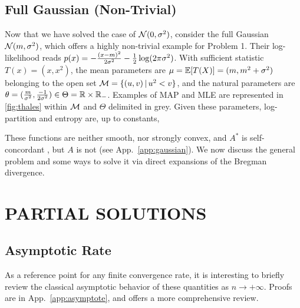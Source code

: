 \documentclass[twoside]{article}
\newcommand{\cond}{\,\vert\,}
\newcommand{\logpart}{A}
\newcommand{\conj}{{\logpart^*}}
\newcommand{\nat}{\theta}
\newcommand{\m}{\mu}
\begin{document}
\subsection{Full Gaussian (Non-Trivial)}
\label{ssec:gaussian}
Now that we have solved the case of ${\mathcal N}(0,\sigma^2)$, consider the full Gaussian ${\mathcal N}(m,\sigma^2)$, which offers a highly non-trivial example for Problem 1.
Their log-likelihood reads $p(x) = -\frac{(x-m)^2}{2 \sigma^2} - \frac{1}{2} \log(2\pi\sigma^2)$.
With sufficient statistic $T(x)=(x, x^2)$,
the mean parameters are $\m = \E[T(X)] = (m , m^2 + \sigma^2)$ belonging to the open set $\cM= \{(u,v) \cond u^2 < v\}$,
and the natural parameters are $\nat= (\frac{m}{\sigma^2} , \frac{-1}{2\sigma^2}) \in \Theta = \real \times \real_-$.
Examples of MAP and MLE  are represented in \cref{fig:thales} within ${\mathcal M}$ and $\Theta$ delimited in grey.
Given these parameters, log-partition and entropy are, up to constants,
\alignn{
	\textstyle \logpart(\nat) &= \textstyle \frac{\nat_1^2}{-4\nat_2} - \half \log(-2\nat_2) \\  %
	\textstyle \conj(\m) &= \textstyle - \half \log (\mu_2 - \mu_1^2)
}

These functions are neither smooth, nor strongly convex, and $\conj$ is self-concordant
\citep[p.177]{nesterov2003introductory} %
, but $\logpart$ is not (see App.~\ref{app:gaussian}).
We now discuss the general problem and some ways to solve it via direct expansions of the Bregman divergence.

\section{PARTIAL SOLUTIONS}
\label{sec:insights}

\subsection{Asymptotic Rate}
\label{ssec:asymptote}
As a reference point for any finite convergence rate, it is interesting to briefly review the classical asymptotic behavior of these quantities as $n \rightarrow +\infty$.
Proofs are in App.~\ref{app:asymptote}, and \citet[\S1.1]{ostrovskii2021finite} offers a more comprehensive review.
\end{document}
